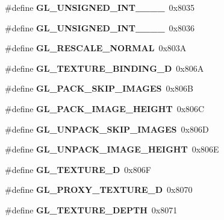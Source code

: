\begin{DoxyCompactItemize}
\item 
\#define {\bfseries G\+L\+\_\+\+U\+N\+S\+I\+G\+N\+E\+D\+\_\+\+I\+N\+T\+\_\+\_\+\_\+\_}~0x8035\label{_s_d_l__opengl_8h_ac164b28463958d495e51702198e6d1cf}

\item 
\#define {\bfseries G\+L\+\_\+\+U\+N\+S\+I\+G\+N\+E\+D\+\_\+\+I\+N\+T\+\_\+\_\+\_\+\_}~0x8036\label{_s_d_l__opengl_8h_a57051f9ece699613fa17e87c9ec66910}

\item 
\#define {\bfseries G\+L\+\_\+\+R\+E\+S\+C\+A\+L\+E\+\_\+\+N\+O\+R\+M\+A\+L}~0x803\+A\label{_s_d_l__opengl_8h_a26be8568349f16a356797abb59af0c7b}

\item 
\#define {\bfseries G\+L\+\_\+\+T\+E\+X\+T\+U\+R\+E\+\_\+\+B\+I\+N\+D\+I\+N\+G\+\_\+D}~0x806\+A\label{_s_d_l__opengl_8h_ac898949a7c8e1d67dd6b1910de1b808c}

\item 
\#define {\bfseries G\+L\+\_\+\+P\+A\+C\+K\+\_\+\+S\+K\+I\+P\+\_\+\+I\+M\+A\+G\+E\+S}~0x806\+B\label{_s_d_l__opengl_8h_a1ebbcabd1c72d2bee103207ff35e471f}

\item 
\#define {\bfseries G\+L\+\_\+\+P\+A\+C\+K\+\_\+\+I\+M\+A\+G\+E\+\_\+\+H\+E\+I\+G\+H\+T}~0x806\+C\label{_s_d_l__opengl_8h_a38a7218f9071810d5aa631da23d6ae89}

\item 
\#define {\bfseries G\+L\+\_\+\+U\+N\+P\+A\+C\+K\+\_\+\+S\+K\+I\+P\+\_\+\+I\+M\+A\+G\+E\+S}~0x806\+D\label{_s_d_l__opengl_8h_a631a0e701301001433205a1c5ba9a4f9}

\item 
\#define {\bfseries G\+L\+\_\+\+U\+N\+P\+A\+C\+K\+\_\+\+I\+M\+A\+G\+E\+\_\+\+H\+E\+I\+G\+H\+T}~0x806\+E\label{_s_d_l__opengl_8h_aa1e6adc033f5df7d4dbf160b5ee0e093}

\item 
\#define {\bfseries G\+L\+\_\+\+T\+E\+X\+T\+U\+R\+E\+\_\+D}~0x806\+F\label{_s_d_l__opengl_8h_a6c865f303c89ec764158e0016e50d4a8}

\item 
\#define {\bfseries G\+L\+\_\+\+P\+R\+O\+X\+Y\+\_\+\+T\+E\+X\+T\+U\+R\+E\+\_\+D}~0x8070\label{_s_d_l__opengl_8h_a1660ed6ba07c342ff4ac182374d48b74}

\item 
\#define {\bfseries G\+L\+\_\+\+T\+E\+X\+T\+U\+R\+E\+\_\+\+D\+E\+P\+T\+H}~0x8071\label{_s_d_l__opengl_8h_a8177de06943e9e08b6f69767c8c18b06}


\end{DoxyCompactItemize}
